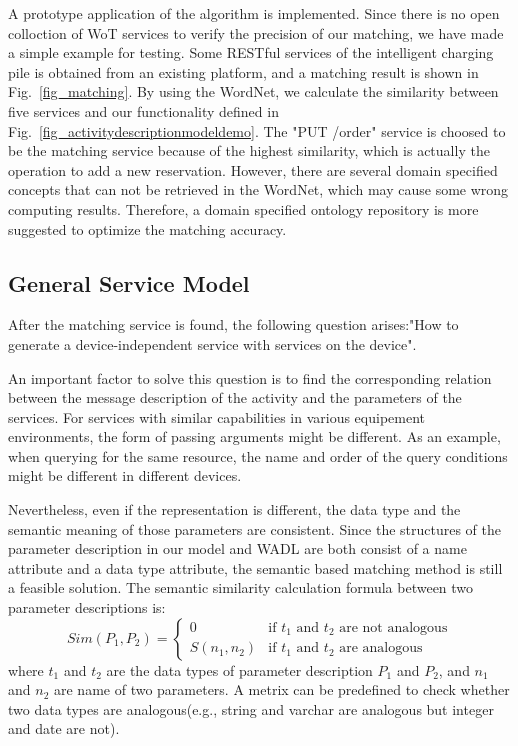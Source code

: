 A prototype application of the algorithm is implemented. Since there is no open colloction of WoT services to verify the precision of our matching, we have made a simple example for testing. Some RESTful services of the intelligent charging pile is obtained from an existing platform, and a matching result is shown in Fig.~\ref{fig_matching}. By using the WordNet, we calculate the similarity between five services and our functionality defined in Fig.~\ref{fig_activitydescriptionmodeldemo}. The "PUT /order" service is choosed to be the matching service because of the highest similarity, which is actually the operation to add a new reservation. However, there are several domain specified concepts that can not be retrieved in the WordNet, which may cause some wrong computing results. Therefore, a domain specified ontology repository is more suggested to optimize the matching accuracy. 

\subsection{General Service Model}
After the matching service is found, the following question arises:"How to generate a device-independent service with services on the device". 

An important factor to solve this question is to find the corresponding relation between the message description of the activity and the parameters of the services. For services with similar capabilities in various equipement environments, the form of passing arguments might be different. As an example, when querying for the same resource, the name and order of the query conditions might be different in different devices. 

Nevertheless, even if the representation is different, the data type and the semantic meaning of those parameters are consistent. Since the structures of the parameter description in our model and WADL are both consist of a name attribute and a data type attribute, the semantic based matching method is still a feasible solution. The semantic similarity calculation formula between two parameter descriptions is: 
\begin{equation}
    Sim(P_1, P_2)=
   \begin{cases}
   0 &\mbox{if $t_1$ and $t_2$ are not analogous}\\
   S(n_1, n_2) &\mbox{if $t_1$ and $t_2$ are analogous}
   \end{cases}
\end{equation}
where $t_1$ and $t_2$ are the data types of parameter description $P_1$ and $P_2$, and $n_1$ and $n_2$ are name of two parameters. A metrix can be predefined to check whether two data types are analogous(e.g., string and varchar are analogous but integer and date are not).

